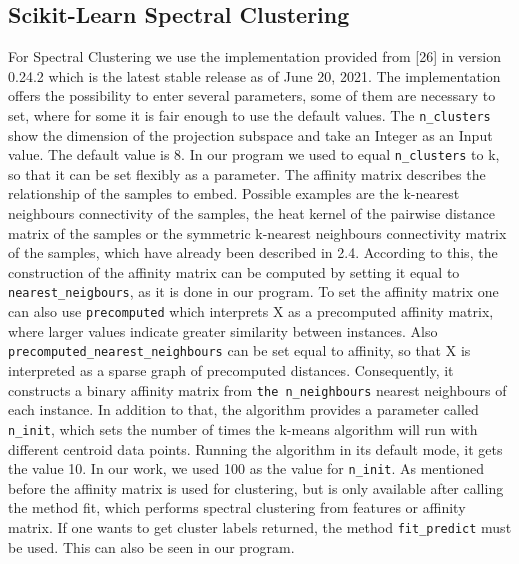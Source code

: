 \subsection{Scikit-Learn Spectral Clustering}
\label{subsec:sklearn_spectral}

For Spectral Clustering we use the implementation provided from [26] in version 0.24.2 which is the latest stable release as of June 20, 2021. The implementation offers the possibility to enter several parameters, some of them are necessary to set, where for some it is fair enough to use the default values.\newline
The \verb|n_clusters| show the dimension of the projection subspace and take an Integer as an Input value. The default value is 8. In our program we used to equal \verb|n_clusters| to k, so that it can be set flexibly as a parameter. \newline
The affinity matrix describes the relationship of the samples to embed. Possible examples are the k-nearest neighbours connectivity of the samples, the heat kernel of the pairwise distance matrix of the samples or the symmetric k-nearest neighbours connectivity matrix of the samples, which have already been described in 2.4. \newline
According to this, the construction of the affinity matrix can be computed by setting it equal to {\verb|nearest_neigbours|}, as it is done in our program. To set the affinity matrix one can also use {\verb|precomputed|} which interprets X as a precomputed affinity matrix, where larger values indicate greater similarity between instances. \newline
Also {\verb|precomputed_nearest_neighbours|} can be set equal to affinity, so that X is interpreted as a sparse graph of precomputed distances. Consequently, it constructs a binary affinity matrix from \verb|the n_neighbours| nearest neighbours of each instance. \newline
In addition to that, the algorithm provides a parameter called \verb|n_init|, which sets the number of times the k-means algorithm will run with different centroid data points.  Running the algorithm in its default mode, it gets the value 10. In our work, we used 100 as the value for \verb|n_init|.
As mentioned before the affinity matrix is used for clustering, but is only available after calling the method fit, which performs spectral clustering from features or affinity matrix. If one wants to get cluster labels returned, the method \verb|fit_predict| must be used. This can also be seen in our program. \newline
